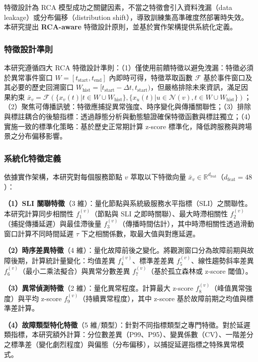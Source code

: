 \documentclass[10pt,a4paper,twocolumn]{article}
\begin{document}
特徵設計為 RCA 模型成功之關鍵因素，不當之特徵會引入資料洩漏（data leakage）或分布偏移（distribution shift），導致訓練集高準確度然部署時失效。本研究提出 \textbf{RCA-aware} 特徵設計原則，並基於實作架構提供系統化定義。

\subsubsection{特徵設計準則}

本研究遵循四大 RCA 特徵設計準則：（1）僅使用前饋特徵以避免洩漏：特徵必須於異常事件窗口 $W = [t_{\text{start}}, t_{\text{end}}]$ 內即時可得，特徵萃取函數 $\mathcal{F}$ 基於事件窗口及其必要的歷史回溯窗口 $W_{\text{hist}} = [t_{\text{start}} - \Delta t, t_{\text{start}})$，但嚴格排除未來資訊，滿足因果約束 $\bar{x}_v = \mathcal{F}\left( \{x_v(t) | t \in W \cup W_{\text{hist}}\}, \{x_u(t) | u \in \mathcal{N}(v), t \in W \cup W_{\text{hist}}\} \right)$；（2）聚焦可傳播訊號：特徵應捕捉異常強度、時序變化與傳播關聯性；（3）排除與標註耦合的後驗指標：透過靜態分析與動態驗證確保特徵函數與標註獨立；（4）實施一致的標準化策略：基於歷史正常期計算 z-score 標準化，降低跨服務與跨場景之分布偏移影響。

\subsubsection{系統化特徵定義}

依據實作架構，本研究對每個服務節點 $v$ 萃取以下特徵向量 $\bar{x}_v \in \mathbb{R}^{d_{\text{feat}}}$（$d_{\text{feat}} = 48$）：

\textbf{（1）SLI 關聯特徵}（3 維）：量化節點與系統級服務水平指標（SLI）之關聯性。本研究計算同步相關性 $f_1^{(v)}$（節點與 SLI 之即時關聯）、最大時滯相關性 $f_2^{(v)}$（捕捉傳播延遲）與最佳滯後量 $f_3^{(v)}$（傳播時間估計），其中時滯相關性透過滑動窗口計算不同時間延遲 $\tau$ 下之相關係數，取最大值與對應延遲。

\textbf{（2）時序差異特徵}（4 維）：量化故障前後之變化。將觀測窗口分為故障前期與故障後期，計算統計量變化：均值差異 $f_4^{(v)}$、標準差差異 $f_5^{(v)}$、線性趨勢斜率差異 $f_6^{(v)}$（最小二乘法擬合）與異常分數差異 $f_7^{(v)}$（基於孤立森林或 z-score 閾值）。

\textbf{（3）異常偵測特徵}（2 維）：量化異常程度。計算最大 z-score $f_8^{(v)}$（峰值異常強度）與平均 z-score $f_9^{(v)}$（持續異常程度），其中 z-score 基於故障前期之均值與標準差計算。

\textbf{（4）故障類型特化特徵}（5 維/類型）：針對不同指標類型之專門特徵。對於延遲類指標，本研究額外計算：分位數差異（P99、P95）、變異係數（CV）、一階差分之標準差（變化劇烈程度）與偏態（分布偏移），以捕捉延遲指標之特殊異常模式。
\end{document}
